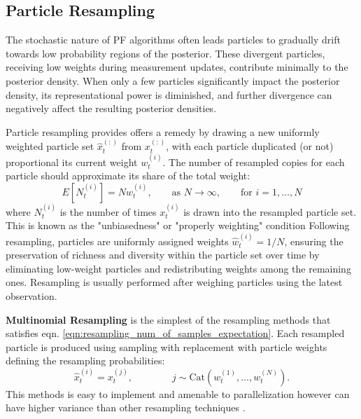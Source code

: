     \subsection{Particle Resampling}
        The stochastic nature of PF algorithms often leads particles to gradually drift towards low probability regions of the posterior. These divergent particles, receiving low weights during measurement updates, contribute minimally to the posterior density. When only a few particles significantly impact the posterior density, its representational power is diminished, and further divergence can negatively affect the resulting posterior densities.
        
        Particle resampling provides offers a remedy by drawing a new uniformly weighted particle set $\hat{x}_t^{(:)}$ from $x_t^{(:)}$, with each particle duplicated (or not) proportional its current weight $w_t^{(i)}$. The number of resampled copies for each particle should approximate its share of the total weight:
        \begin{equation}
             E[N_t^{(i)}] = Nw_t^{(i)}, \qquad \text{as } N \rightarrow \infty, \qquad \text{for } i = 1, ..., N
            \label{eqn:resampling_num_of_samples_expectation}
        \end{equation}	
         where $N_t^{(i)}$ is the number of times $x_t^{(i)}$ is drawn into the resampled particle set. This is known as the "unbiasedness" or "properly weighting" condition  \cite{liu1998sequential, douc2005comparison}
         Following resampling, particles are uniformly assigned weights $\hat{w}_t^{(i)} = 1/N$, ensuring the preservation of richness and diversity within the particle set over time by eliminating low-weight particles and redistributing weights among the remaining ones. Resampling is usually performed after weighing particles using the latest observation.
        
        \textbf{Multinomial Resampling} is the simplest of the resampling methods that satisfies eqn. \ref{eqn:resampling_num_of_samples_expectation}.  Each resampled particle is produced using sampling with replacement with particle weights defining the resampling probabilities:
        \begin{equation}
             \hat{x}_t^{(i)} = x_t^{(j)},  \qquad\qquad j \sim \text{Cat}(w_t^{(1)},\ldots,w_t^{(N)}).
            \label{eqn:multinomial_resampling}
        \end{equation}	
        This methods is easy to implement and amenable to parallelization however can have higher variance than other resampling techniques \cite{douc2005comparison}.
        

